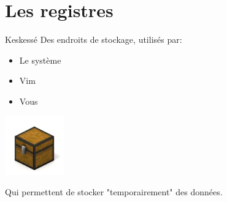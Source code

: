 \documentclass[10pt]{beamer}
\begin{document}
\section{Les registres}
	\begin{frame}{Keskessé}
		Des endroits de stockage, utilisés par:\\
		\begin{itemize}
			\item Le système
			\item Vim
			\item Vous
		\end{itemize}
		\includegraphics[width=96]{img/chest.jpg}

		Qui permettent de stocker "temporairement" des données.
	\end{frame}
\end{document}
